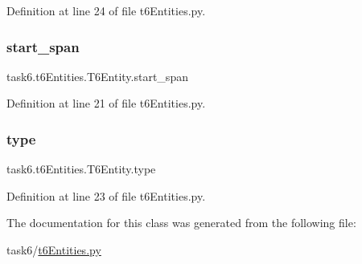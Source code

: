 Definition at line 24 of file t6\+Entities.\+py.

\mbox{\label{classtask6_1_1t6Entities_1_1T6Entity_a52779e9af8864dc98e8b02fc5b9b041a}} 
\subsubsection{\texorpdfstring{start\+\_\+span}{start\_span}}
{\footnotesize\ttfamily task6.\+t6\+Entities.\+T6\+Entity.\+start\+\_\+span}



Definition at line 21 of file t6\+Entities.\+py.

\mbox{\label{classtask6_1_1t6Entities_1_1T6Entity_ae4299399be3ecbd68dbb9ae988bff5a8}} 
\subsubsection{\texorpdfstring{type}{type}}
{\footnotesize\ttfamily task6.\+t6\+Entities.\+T6\+Entity.\+type}



Definition at line 23 of file t6\+Entities.\+py.



The documentation for this class was generated from the following file\+:\begin{DoxyCompactItemize}
\item 
task6/\hyperlink{t6Entities_8py}{t6\+Entities.\+py}\end{DoxyCompactItemize}
